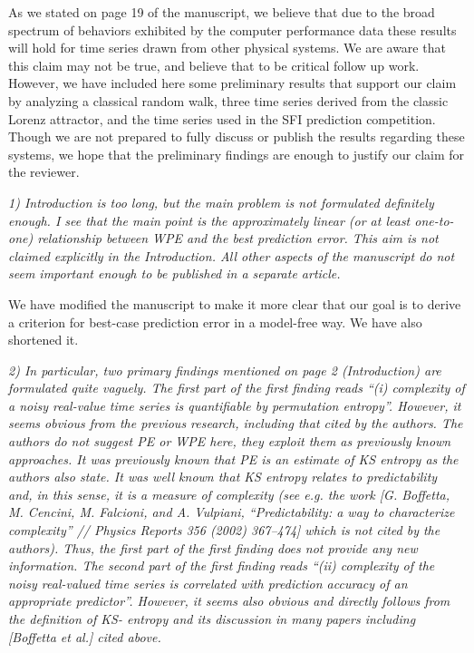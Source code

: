 \documentclass[12pt]{article}
\begin{document}
As we stated on page 19 of the manuscript, we believe that due to the broad
spectrum of behaviors exhibited by the computer performance data these results
will hold for time series drawn from other physical systems. We are aware that
this claim may not be true, and believe that to be critical follow up work.
However, we have included here some preliminary results that support our claim
by analyzing a classical random walk, three time series derived from the classic
Lorenz attractor, and the time series used in the SFI prediction competition.
Though we are not prepared to fully discuss or publish the results regarding
these systems, we hope that the preliminary findings are enough to justify our
claim for the reviewer.

\emph{1) Introduction is too long, but the main problem is not formulated
definitely enough. I see that the main point is the approximately linear (or at
least one-to-one) relationship between WPE and the best prediction error. This
aim is not claimed explicitly in the Introduction. All other aspects of the
manuscript do not seem important enough to be published in a separate article.}

We have modified the manuscript to make it more clear that our goal is to derive
a criterion for best-case prediction error in a model-free way. We have also
shortened it.

\emph{2) In particular, two primary findings mentioned on page 2 (Introduction)
are formulated quite vaguely. The first part of the first finding reads ``(i)
complexity of a noisy real-value time series is quantifiable by permutation
entropy''. However, it seems obvious from the previous research, including that
cited by the authors. The authors do not suggest PE or WPE here, they exploit
them as previously known approaches. It was previously known that PE is an
estimate of KS entropy as the authors also state. It was well known that KS
entropy relates to predictability and, in this sense, it is a measure of
complexity (see e.g. the work [G. Boffetta, M. Cencini, M. Falcioni, and A.
Vulpiani, ``Predictability: a way to characterize complexity'' // Physics
Reports 356 (2002) 367–474] which is not cited by the authors). Thus, the first
part of the first finding does not provide any new information. The second part
of the first finding reads ``(ii) complexity of the noisy real-valued time
series is correlated with prediction accuracy of an appropriate predictor''.
However, it seems also obvious and directly follows from the definition of KS-
entropy and its discussion in many papers including [Boffetta et al.] cited
above.}
\end{document}
